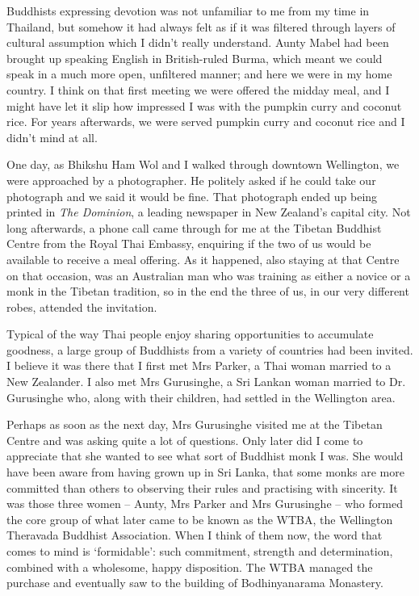 Buddhists expressing devotion was not unfamiliar to me from my time in
Thailand, but somehow it had always felt as if it was filtered through
layers of cultural assumption which I didn't really understand. Aunty
Mabel had been brought up speaking English in British-ruled Burma, which
meant we could speak in a much more open, unfiltered manner; and here we
were in my home country. I think on that first meeting we were offered
the midday meal, and I might have let it slip how impressed I was with
the pumpkin curry and coconut rice. For years afterwards, we were served
pumpkin curry and coconut rice and I didn't mind at all.

One day, as Bhikshu Ham Wol and I walked through downtown Wellington, we
were approached by a photographer. He politely asked if he could take
our photograph and we said it would be fine. That photograph ended up
being printed in \emph{The Dominion}, a leading newspaper in New
Zealand's capital city. Not long afterwards, a phone call came through
for me at the Tibetan Buddhist Centre from the Royal Thai Embassy,
enquiring if the two of us would be available to receive a meal
offering. As it happened, also staying at that Centre on that occasion,
was an Australian man who was training as either a novice or a monk in
the Tibetan tradition, so in the end the three of us, in our very
different robes, attended the invitation.

Typical of the way Thai people enjoy sharing opportunities to accumulate
goodness, a large group of Buddhists from a variety of countries had
been invited. I believe it was there that I first met Mrs Parker, a Thai
woman married to a New Zealander. I also met Mrs Gurusinghe, a Sri
Lankan woman married to Dr. Gurusinghe who, along with their children, had
settled in the Wellington area.

Perhaps as soon as the next day, Mrs Gurusinghe visited me at the
Tibetan Centre and was asking quite a lot of questions. Only later did I
come to appreciate that she wanted to see what sort of Buddhist monk I
was. She would have been aware from having grown up in Sri Lanka, that
some monks are more committed than others to observing their rules and
practising with sincerity. It was those three women -- Aunty, Mrs Parker
and Mrs Gurusinghe -- who formed the core group of what later came to be
known as the WTBA, the Wellington Theravada Buddhist Association. When I
think of them now, the word that comes to mind is `formidable': such
commitment, strength and determination, combined with a wholesome, happy
disposition. The WTBA managed the purchase and eventually saw to the
building of Bodhinyanarama Monastery\cite{bodhinyanarama}.

